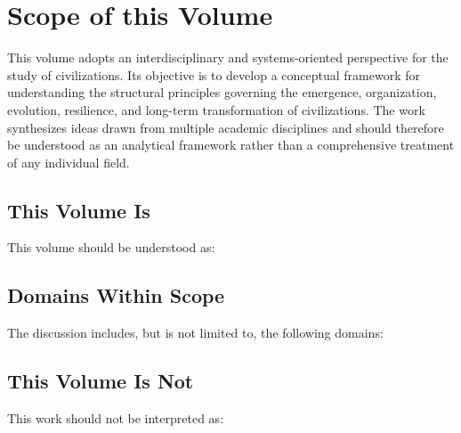 \section*{Scope of this Volume}

This volume adopts an interdisciplinary and systems-oriented perspective for the study of civilizations. Its objective is to develop a conceptual framework for understanding the structural principles governing the emergence, organization, evolution, resilience, and long-term transformation of civilizations. The work synthesizes ideas drawn from multiple academic disciplines and should therefore be understood as an analytical framework rather than a comprehensive treatment of any individual field.

\subsection*{This Volume Is}

This volume should be understood as:


\subsection*{Domains Within Scope}

The discussion includes, but is not limited to, the following domains:



\subsection*{This Volume Is Not}

This work should not be interpreted as:

